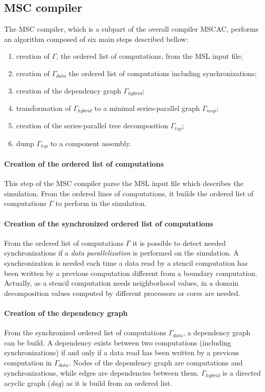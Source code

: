 \subsection{MSC compiler}
The MSC compiler, which is a subpart of the overall compiler MSCAC, performs an algorithm composed of six main steps described bellow:

\begin{enumerate}
\item creation of $\Gamma$, the ordered list of computations, from the MSL input file;
\item creation of $\Gamma_{data}$ the ordered list of computations including synchronizations;
\item creation of the dependency graph $\Gamma_{hybrid}$;
\item transformation of $\Gamma_{hybrid}$ to a minimal series-parallel graph $\Gamma_{msp}$;
\item creation of the series-parallel tree decomposition $\Gamma_{tsp}$;
\item dump $\Gamma_{tsp}$ to a component assembly.
\end{enumerate}

\paragraph{Creation of the ordered list of computations} This step of the MSC compiler parse the MSL input file which describes the simulation. From the ordered lines of computations, it builds the ordered list of computations $\Gamma$ to perform in the simulation.

\paragraph{Creation of the synchronized ordered list of computations} From the ordered list of computations $\Gamma$ it is possible to detect needed synchronizations if a \emph{data parallelization} is performed on the simulation. A synchronization is needed each time a data read by a stencil computation has been written by a previous computation different from a boundary computation. Actually, as a stencil computation needs neighborhood values, in a domain decomposition values computed by different processors or cores are needed.

\paragraph{Creation of the dependency graph} From the synchronized ordered list of computations $\Gamma_{data}$, a dependency graph can be build. A dependency exists between two computations (including synchronizations) if and only if a data read has been written by a previous computation in $\Gamma_{data}$. Nodes of the dependency graph are computations and synchronizations, while edges are dependencies between them. $\Gamma_{hybrid}$ is a directed acyclic graph (\emph{dag}) as it is build from an ordered list.

